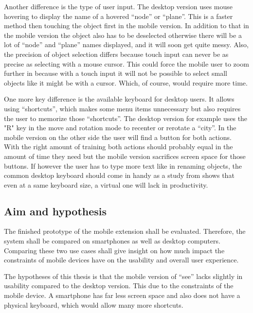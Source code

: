 Another difference is the type of user input.
The desktop version uses mouse hovering to display the name of a hovered \enquote{\gls{node}} or \enquote{\gls{plane}}.
This is a faster method then touching the object first in the mobile version. 
In addition to that in the mobile version the object also has to be deselected otherwise there will be a lot of \enquote{\gls{node}} and \enquote{\gls{plane}} names displayed, and it will soon get quite messy.
Also, the precision of object selection differs because touch input can never be as precise as selecting with a mouse cursor. 
This could force the mobile user to zoom further in because with a touch input it will not be possible to select small objects like it might be with a cursor.
Which, of course, would require more time.

One more key difference is the available keyboard for desktop users.
It allows using \enquote{\glspl{shortcut}}, which makes some menu items unnecessary but also requires the user to memorize those \enquote{\glspl{shortcut}}.
The desktop version for example uses the "R" key in the move and rotation mode to recenter or rerotate a \enquote{\gls{city}}.
In the mobile version on the other side the user will find a button for both actions. 
With the right amount of training both actions should probably equal in the amount of time they need but the mobile version sacrifices screen space for those buttons.
If however the user has to type more text like in renaming objects, the common desktop keyboard should come in handy as a study from \cite{kim2014differences} shows that even at a same keyboard size, a virtual one will lack in productivity.
\subsection{Aim and hypothesis}
\label{aim}
The finished prototype of the mobile extension shall be evaluated. 
Therefore, the system shall be compared on smartphones as well as desktop computers. 
Comparing these two use cases shall give insight on how much impact the constraints of mobile devices have on the usability and overall user experience.

The hypotheses of this thesis is that the mobile version of \enquote{\gls{see}} lacks slightly in usability compared to the desktop version.
This due to the constraints of the mobile device. 
A smartphone has far less screen space and also does not have a physical keyboard, which would allow many more shortcuts.
